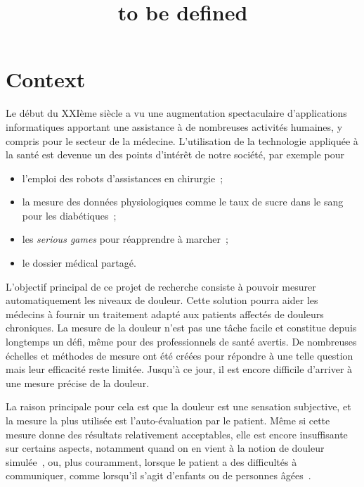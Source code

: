 \documentclass[11pt]{article}
\date{}
\title{to be defined}
\begin{document}
\maketitle

\section{Context}
\label{sec:orgf816e45}

Le début du XXIème siècle a vu une augmentation spectaculaire d’applications
informatiques apportant une assistance à de nombreuses activités
humaines, y compris pour le secteur de la médecine. L’utilisation de
la technologie appliquée à la santé est devenue un des points
d’intérêt de notre société, par exemple pour 
\begin{itemize}
\item l’emploi des robots d'assistances en chirurgie~;
\item la mesure des données physiologiques comme le taux de sucre dans le sang pour les diabétiques~;
\item les \emph{serious games} pour réapprendre à marcher~;
\item le dossier médical partagé.
\end{itemize}


L’objectif  principal de  ce  projet  de recherche  consiste  à pouvoir  mesurer
automatiquement  les  niveaux  de  douleur.  Cette
solution   pourra  aider  les médecins  à fournir  un  traitement adapté  aux
patients affectés de douleurs chroniques. La  mesure de la douleur n’est pas une
tâche facile et constitue depuis longtemps un défi, même pour des professionnels
de santé  avertis. De nombreuses échelles  et méthodes de mesure  ont été créées
pour             répondre à            une             telle             question
\cite{wong1996wong,mccaffery1999pain,portenoy1996visual,melzack1975mcgill,galer1997development,gracely1988descriptor}
mais leur  efficacité reste limitée.  Jusqu’à  ce jour, il est  encore difficile
d’arriver à une mesure précise de la douleur.

La raison principale pour cela est  que la douleur est une sensation subjective,
et la  mesure la plus  utilisée est l’auto-évaluation  par le patient.   Même si
cette  mesure donne  des  résultats relativement  acceptables,  elle est  encore
insuffisante sur  certains aspects, notamment quand  on en vient à  la notion de
douleur simulée~\cite{gwen2007faces}, ou, plus  couramment, lorsque le patient a
des difficultés à communiquer, comme  lorsqu’il s’agit d’enfants ou de personnes
âgées~\cite{lucey2011automatically}.
\end{document}

